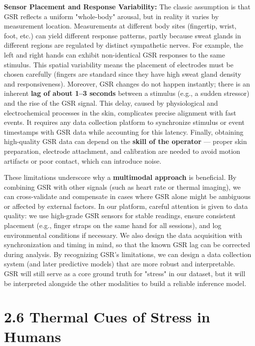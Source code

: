 \textbf{Sensor Placement and Response Variability:} The classic assumption is that GSR reflects a uniform "whole-body" arousal, but in reality it varies by measurement location. Measurements at different body sites (fingertip, wrist, foot, etc.) can yield different response patterns, partly because sweat glands in different regions are regulated by distinct sympathetic nerves\cite{ElectrodermalActivityWiki}. For example, the left and right hands can exhibit non-identical GSR responses to the same stimulus\cite{ElectrodermalActivityWiki}. This spatial variability means the placement of electrodes must be chosen carefully (fingers are standard since they have high sweat gland density and responsiveness). Moreover, GSR changes do not happen instantly; there is an inherent \textbf{lag of about 1–3 seconds} between a stimulus (e.g., a sudden stressor) and the rise of the GSR signal\cite{ElectrodermalActivityWiki}. This delay, caused by physiological and electrochemical processes in the skin, complicates precise alignment with fast events. It requires any data collection platform to synchronize stimulus or event timestamps with GSR data while accounting for this latency. Finally, obtaining high-quality GSR data can depend on the \textbf{skill of the operator}\cite{ElectrodermalActivityWiki} — proper skin preparation, electrode attachment, and calibration are needed to avoid motion artifacts or poor contact, which can introduce noise.

These limitations underscore why a \textbf{multimodal approach} is beneficial. By combining GSR with other signals (such as heart rate or thermal imaging), we can cross-validate and compensate in cases where GSR alone might be ambiguous or affected by external factors. In our platform, careful attention is given to data quality: we use high-grade GSR sensors for stable readings, ensure consistent placement (e.g., finger straps on the same hand for all sessions), and log environmental conditions if necessary. We also design the data acquisition with synchronization and timing in mind, so that the known GSR lag can be corrected during analysis. By recognizing GSR's limitations, we can design a data collection system (and later predictive models) that are more robust and interpretable. GSR will still serve as a core ground truth for "stress" in our dataset, but it will be interpreted alongside the other modalities to build a reliable inference model.

\section{2.6 Thermal Cues of Stress in Humans}

